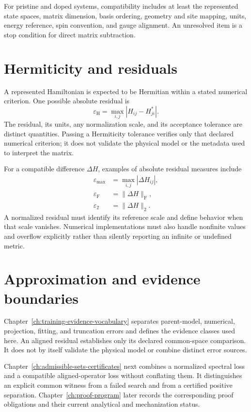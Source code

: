 For pristine and doped systems, compatibility includes at least the represented
state spaces, matrix dimension, basis ordering, geometry and site mapping,
units, energy reference, spin convention, and gauge alignment. An unresolved
item is a stop condition for direct matrix subtraction.

\section{Hermiticity and residuals}


A represented Hamiltonian is expected to be Hermitian within a stated numerical
criterion. One possible absolute residual is
\begin{equation}
  \varepsilon_{\mathrm H}
  =
  \max_{i,j}\left|H_{ij}-H_{ji}^{*}\right|.
\end{equation}
The residual, its units, any normalization scale, and its acceptance tolerance
are distinct quantities. Passing a Hermiticity tolerance verifies only that
declared numerical criterion; it does not validate the physical model or the
metadata used to interpret the matrix.

For a compatible difference $\Delta H$, examples of absolute residual measures
include
\begin{align}
  \varepsilon_{\max} &= \max_{i,j}|\Delta H_{ij}|,\\
  \varepsilon_{\mathrm F} &= \|\Delta H\|_{\mathrm F},\\
  \varepsilon_{2} &= \|\Delta H\|_{2}.
\end{align}
A normalized residual must identify its reference scale and define behavior
when that scale vanishes. Numerical implementations must also handle nonfinite
values and overflow explicitly rather than silently reporting an infinite or
undefined metric.

\section{Approximation and evidence boundaries}

Chapter~\ref{ch:training-evidence-vocabulary} separates parent-model,
numerical, projection, fitting, and truncation errors and defines the evidence
classes used here. An aligned residual establishes only its declared
common-space comparison. It does not by itself validate the physical model or
combine distinct error sources.

Chapter~\ref{ch:admissible-sets-certificates} next combines a normalized
spectral loss and a compatible aligned-operator loss without conflating them.
It distinguishes an explicit common witness from a failed search and from a
certified positive separation. Chapter~\ref{ch:proof-program} later records the
corresponding proof obligations and their current analytical and mechanization
status.

